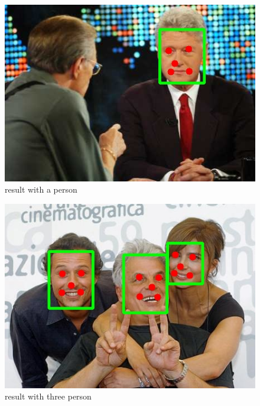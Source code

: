 \documentclass[journal, a4paper]{IEEEtran}
\begin{document}
		\begin{figure}
		\begin{center}
		\includegraphics[width=\columnwidth]{images/13869.jpg}
		\caption{result with a person}
		\label{fig:13869}
		\end{center}
	\end{figure}
	
	\begin{figure}
		\begin{center}
		\includegraphics[width=\columnwidth]{images/13692.jpg}
		\caption{result with three person}
		\label{fig:13692}
		\end{center}
	\end{figure}
	
\end{document}
